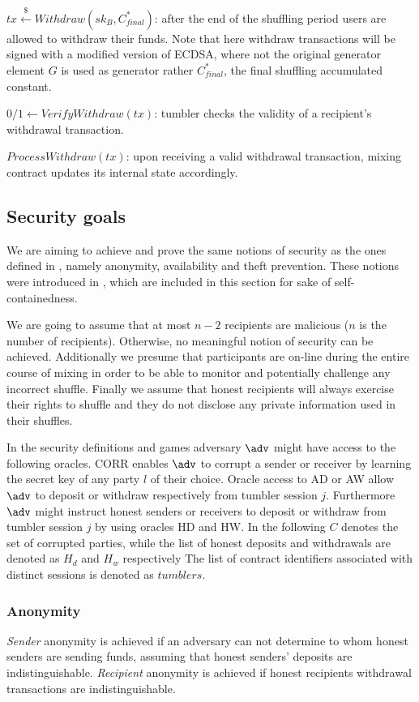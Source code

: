 \documentclass[conference, compsoc]{IEEEtran}
\theoremstyle{definition}
\begin{document}
$tx\stackrel{\$}{\leftarrow}Withdraw(sk_B, C^{*}_{final})$: after the end of the shuffling period users are allowed to withdraw their funds. Note that here withdraw transactions will be signed with a modified version of ECDSA, where not the original generator element $G$ is used as generator rather $C^{*}_{final}$, the final shuffling accumulated constant.

$0/1\leftarrow VerifyWithdraw(tx)$: tumbler checks the validity of a recipient's withdrawal transaction.

$ProcessWithdraw(tx)$: upon receiving a valid withdrawal transaction, mixing contract updates its internal state accordingly.

\subsection{Security goals} \label{securitygoals}
We are aiming to achieve and prove the same notions of security as the ones defined in \cite{meiklejohn2018mobius}, namely anonymity, availability and theft prevention. These notions were introduced in \cite{meiklejohn2018mobius}, which are included in this section for sake of self-containedness.

We are going to assume that at most $n-2$ recipients are malicious ($n$ is the number of recipients). Otherwise, no meaningful notion of security can be achieved. Additionally we presume that participants are on-line during the entire course of mixing in order to be able to monitor and potentially challenge any incorrect shuffle. Finally we assume that honest recipients will always exercise their rights to shuffle and they do not disclose any private information used in their shuffles.

In the security definitions and games adversary $\adv$ might have access to the following oracles. CORR enables $\adv$ to corrupt a sender or receiver by learning the secret key of any party $l$ of their choice. Oracle access to AD or AW allow $\adv$ to deposit or withdraw respectively from tumbler session $j$. Furthermore $\adv$ might instruct honest senders or receivers to deposit or withdraw from tumbler session $j$ by using oracles HD and HW. In the following $C$ denotes the set of corrupted parties, while the list of honest deposits and withdrawals are denoted as $H_{d}$ and $H_{w}$ respectively The list of contract identifiers associated with distinct sessions is denoted as $tumblers$.

\subsubsection{Anonymity} \label{sec:defanonymity}
\textit{Sender} anonymity is achieved if an adversary can not determine to whom honest senders are sending funds, assuming that honest senders' deposits are indistinguishable. \textit{Recipient} anonymity is achieved if honest recipients withdrawal transactions are indistinguishable. 
\end{document}
